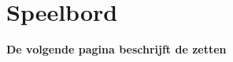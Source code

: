 \section*{Speelbord}

\begin{center}
\end{center}

\vspace{+0.4cm}

\centerline{\Large{\textbf{De volgende pagina beschrijft de zetten}}}